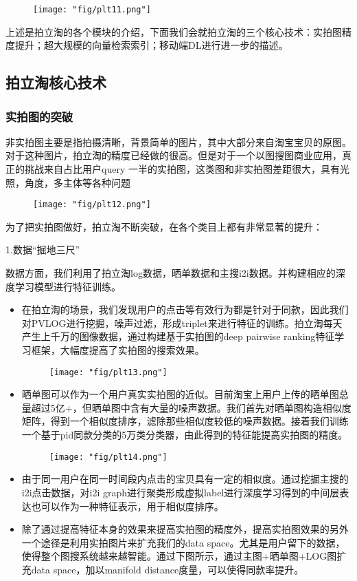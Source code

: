 \begin{figure}[!h]
	\centering
	\texttt{[image: "fig/plt11.png"]}
	\caption{}
	\label{fig:plt11}
\end{figure}

上述是拍立淘的各个模块的介绍，下面我们会就拍立淘的三个核心技术：实拍图精度提升；超大规模的向量检索索引；移动端DL进行进一步的描述。


\subsection{拍立淘核心技术}
\subsubsection{实拍图的突破}
非实拍图主要是指拍摄清晰，背景简单的图片，其中大部分来自淘宝宝贝的原图。对于这种图片，拍立淘的精度已经做的很高。但是对于一个以图搜图商业应用，真正的挑战来自占比用户query 一半的实拍图，这类图和非实拍图差距很大，具有光照，角度，多主体等各种问题
\begin{figure}[!h]
	\centering
	\texttt{[image: "fig/plt12.png"]}
	\caption{}
	\label{fig:plt12}
\end{figure}
为了把实拍图做好，拍立淘不断突破，在各个类目上都有非常显著的提升：

1.数据“掘地三尺”

数据方面，我们利用了拍立淘log数据，晒单数据和主搜i2i数据。并构建相应的深度学习模型进行特征训练。
\begin{itemize}
\item 在拍立淘的场景，我们发现用户的点击等有效行为都是针对于同款，因此我们对PVLOG进行挖掘，噪声过滤，形成triplet来进行特征的训练。拍立淘每天产生上千万的图像数据，通过构建基于实拍图的deep pairwise ranking特征学习框架，大幅度提高了实拍图的搜索效果。
\begin{figure}[!h]
	\centering
	\texttt{[image: "fig/plt13.png"]}
	\caption{}
	\label{fig:plt13}
\end{figure}
\item 晒单图可以作为一个用户真实实拍图的近似。目前淘宝上用户上传的晒单图总量超过5亿+，但晒单图中含有大量的噪声数据。我们首先对晒单图构造相似度矩阵，得到一个相似度排序，滤除那些相似度较低的噪声数据。接着我们训练一个基于pid同款分类的5万类分类器，由此得到的特征能提高实拍图的精度。
\begin{figure}[!h]
	\centering
	\texttt{[image: "fig/plt14.png"]}
	\caption{}
	\label{fig:plt14}
\end{figure}

\item 由于同一用户在同一时间段内点击的宝贝具有一定的相似度。通过挖掘主搜的i2i点击数据，对i2i graph进行聚类形成虚拟label进行深度学习得到的中间层表达也可以作为一种特征表示，用于相似度排序。
\item 除了通过提高特征本身的效果来提高实拍图的精度外，提高实拍图效果的另外一个途径是利用实拍图片来扩充我们的data space。尤其是用户留下的数据，使得整个图搜系统越来越智能。通过下图所示，通过主图+晒单图+LOG图扩充data space，加以manifold distance度量，可以使得同款率提升。
\end{itemize}


